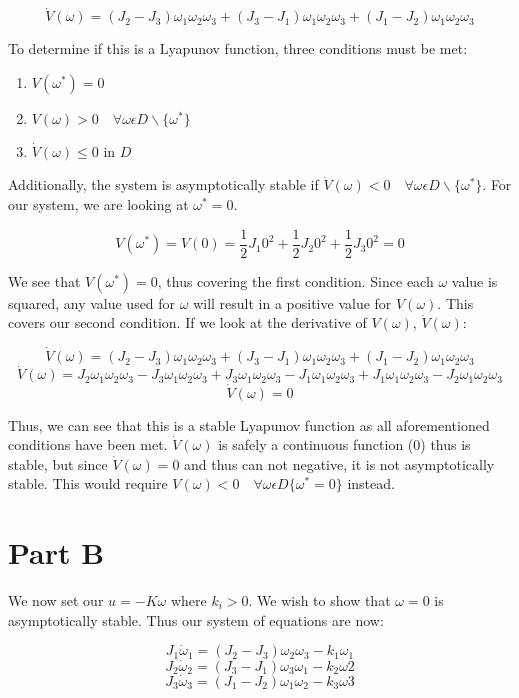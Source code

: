 \documentclass{article}
\begin{document}
\[ \dot{V}(\omega) = (J_2-J_3)\omega_1 \omega_2 \omega_3 + (J_3-J_1) \omega_1 \omega_2 \omega_3 + (J_1-J_2) \omega_1 \omega_2 \omega_3\]

To determine if this is a Lyapunov function, three conditions must be met:
\begin{enumerate}
    \item $V(\omega^*)=0$
    \item $V(\omega) > 0 \quad \forall \omega \epsilon D \backslash \{\omega^*\}$
    \item $\dot{V}(\omega) \leq 0$ in $D$
\end{enumerate}
Additionally, the system is asymptotically stable if $\dot{V}(\omega) < 0 \quad \forall \omega \epsilon D \backslash \{\omega^*\}$. For our system, we are looking at $\omega^* = 0$.

\[ V(\omega^*) = V(0) = \frac{1}{2} J_1 0^2 + \frac{1}{2} J_2 0^2 + \frac{1}{2} J_3 0^2 = 0 \]

We see that $V(\omega^*) = 0$, thus covering the first condition. Since each $\omega$ value is squared, any value used for $\omega$ will result in a positive value for $V(\omega)$. This covers our second condition. If we look at the derivative of $V(\omega)$, $\dot{V}(\omega)$:

\[ \dot{V}(\omega) = (J_2-J_3)\omega_1 \omega_2 \omega_3 + (J_3-J_1) \omega_1 \omega_2 \omega_3 + (J_1-J_2) \omega_1 \omega_2 \omega_3 \]
\[
    \dot{V}(\omega) = J_2 \omega_1 \omega_2 \omega_3 - J_3 \omega_1 \omega_2 \omega_3 + J_3 \omega_1 \omega_2 \omega_3 - J_1 \omega_1 \omega_2 \omega_3 + J_1 \omega_1 \omega_2 \omega_3 - J_2 \omega_1 \omega_2 \omega_3
\]
\[ \dot{V}(\omega) = 0\]

Thus, we can see that this is a stable Lyapunov function as all aforementioned conditions have been met. $\dot{V}(\omega)$ is safely a continuous function ($0$) thus is stable, but since $\dot{V}(\omega) = 0$ and thus can not negative, it is not asymptotically stable. This would require $V(\omega) < 0 \quad \forall \omega \epsilon D \{\omega^* = 0\}$ instead.

\section*{Part B}

We now set our $u=-K\omega$ where $k_i > 0$. We wish to show that $\omega=0$ is asymptotically stable. Thus our system of equations are now:

\[J_1 \dot{\omega}_1 = (J_2 - J_3)\omega_2 \omega_3 - k_1 \omega_1 \]
\[J_2 \dot{\omega}_2 = (J_3 - J_1)\omega_3 \omega_1 - k_2 \omega2\]
\[J_3 \dot{\omega}_3 = (J_1 - J_2)\omega_1 \omega_2 - k_3 \omega3 \]
\end{document}
